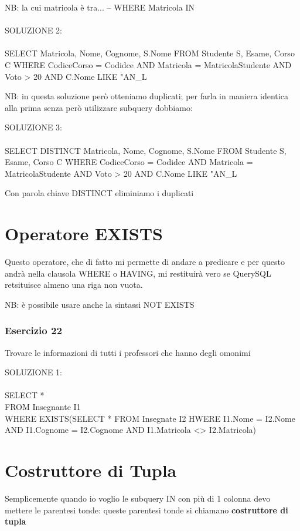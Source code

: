 \documentclass[12pt,a4paper]{book}
\begin{document}
NB: la cui matricola è tra... -- WHERE Matricola IN\\
\\
SOLUZIONE 2:\\
\\
SELECT Matricola, Nome, Cognome, S.Nome
FROM Studente S, Esame, Corso C
WHERE CodiceCorso = Codidce AND Matricola = MatricolaStudente AND Voto > 20 AND C.Nome LIKE "AN_L%

NB: in questa soluzione però otteniamo duplicati; per farla in maniera identica alla prima senza però utilizzare subquery dobbiamo:

SOLUZIONE 3:\\
\\
SELECT DISTINCT Matricola, Nome, Cognome, S.Nome
FROM Studente S, Esame, Corso C
WHERE CodiceCorso = Codidce AND Matricola = MatricolaStudente AND Voto > 20 AND C.Nome LIKE "AN_L%

Con parola chiave DISTINCT eliminiamo i duplicati 

\section{Operatore EXISTS}
Questo operatore, che di fatto mi permette di andare a predicare e per questo andrà nella clausola WHERE o HAVING, mi restituirà vero se QuerySQL retsituisce almeno una riga non vuota.

NB: è possibile usare anche la sintassi NOT EXISTS

\subsubsection{Esercizio 22}
Trovare le informazioni di tutti i professori che hanno degli omonimi

SOLUZIONE 1:\\
\\
SELECT *\\
FROM Insegnante I1\\
WHERE EXISTS(SELECT * FROM Insegnate I2 HWERE I1.Nome = I2.Nome AND I1.Cognome = I2.Cognome AND I1.Matricola <> I2.Matricola)

\section{Costruttore di Tupla}
Semplicemente quando io voglio le subquery IN con più di 1 colonna devo mettere le parentesi tonde: queste parentesi tonde si chiamano \textbf{costruttore di tupla}
\end{document}
